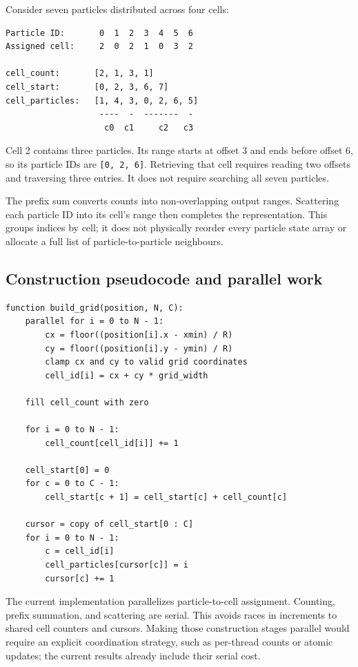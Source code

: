 \documentclass[
  11pt,
]{article}
\begin{document}
Consider seven particles distributed across four cells:

\begin{verbatim}
Particle ID:       0  1  2  3  4  5  6
Assigned cell:     2  0  2  1  0  3  2

cell_count:       [2, 1, 3, 1]
cell_start:       [0, 2, 3, 6, 7]
cell_particles:   [1, 4, 3, 0, 2, 6, 5]
                   ----  -  -------  -
                    c0  c1     c2   c3
\end{verbatim}

Cell 2 contains three particles. Its range starts at offset 3 and ends
before offset 6, so its particle IDs are \texttt{{[}0,\ 2,\ 6{]}}.
Retrieving that cell requires reading two offsets and traversing three
entries. It does not require searching all seven particles.

The prefix sum converts counts into non-overlapping output ranges.
Scattering each particle ID into its cell's range then completes the
representation. This groups indices by cell; it does not physically
reorder every particle state array or allocate a full list of
particle-to-particle neighbours.

\subsection{Construction pseudocode and parallel
work}\label{construction-pseudocode-and-parallel-work}

\begin{verbatim}
function build_grid(position, N, C):
    parallel for i = 0 to N - 1:
        cx = floor((position[i].x - xmin) / R)
        cy = floor((position[i].y - ymin) / R)
        clamp cx and cy to valid grid coordinates
        cell_id[i] = cx + cy * grid_width

    fill cell_count with zero

    for i = 0 to N - 1:
        cell_count[cell_id[i]] += 1

    cell_start[0] = 0
    for c = 0 to C - 1:
        cell_start[c + 1] = cell_start[c] + cell_count[c]

    cursor = copy of cell_start[0 : C]
    for i = 0 to N - 1:
        c = cell_id[i]
        cell_particles[cursor[c]] = i
        cursor[c] += 1
\end{verbatim}

The current implementation parallelizes particle-to-cell assignment.
Counting, prefix summation, and scattering are serial. This avoids races
in increments to shared cell counters and cursors. Making those
construction stages parallel would require an explicit coordination
strategy, such as per-thread counts or atomic updates; the current
results already include their serial cost.
\end{document}
